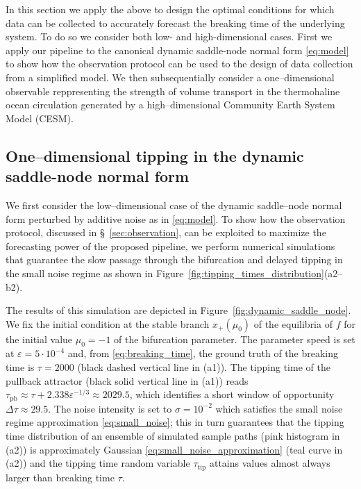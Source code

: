 \documentclass[openacc]{rsproca_new}
\begin{document}
In this section we apply the above to design the optimal conditions for which data can be collected to accurately forecast the breaking time of the underlying system.
To do so we consider both low- and high-dimensional cases.
First we apply our pipeline to the canonical dynamic saddle-node normal form \eqref{eq:model} to show how the observation protocol can be used to the design of data collection from a simplified model.
We then subsequentially consider a one--dimensional observable reppresenting the strength of volume transport in the thermohaline ocean circulation generated by a high--dimensional Community Earth System Model (CESM).

\subsection{One--dimensional tipping in the dynamic saddle-node normal form}\label{subsec:dynamic_sn_normal_form}

We first consider the low--dimensional case of the dynamic saddle--node normal form perturbed by additive noise as in \eqref{eq:model}.
To show how the observation protocol, discussed in \S~\ref{sec:observation}, can be exploited to maximize the forecasting power of the proposed pipeline, we perform numerical simulations that guarantee the slow passage through the bifurcation and delayed tipping in the small noise regime as shown in Figure~\ref{fig:tipping_times_distribution}(a2--b2).

The results of this simulation are depicted in Figure~\ref{fig:dynamic_saddle_node}.
We fix the initial condition at the stable branch $x_+(\mu_0)$ of the equilibria of $f$ for the initial value $\mu_0=-1$ of the bifurcation parameter.
The parameter speed is set at $\varepsilon=5\cdot10^{-4}$ and, from \eqref{eq:breaking_time}, the ground truth of the breaking time is $\tau=2000$ (black dashed vertical line in (a1)).
The tipping time of the pullback attractor (black solid vertical line in (a1)) reads $\tau_{\mathrm{pb}}\approx\tau + 2.338 \varepsilon^{-1/3}\approx 2029.5$, which identifies a short window of opportunity $\Delta\tau\approx29.5$.
The noise intensity is set to $\sigma=10^{-2}$ which satisfies the small noise regime approximation \eqref{eq:small_noise}; this in turn guarantees that the tipping time distribution of an ensemble of simulated sample paths (pink histogram in (a2)) is approximately Gaussian \eqref{eq:small_noise_approximation} (teal curve in (a2)) and the tipping time random variable $\tau_{\mathrm{tip}}$ attains values almost always larger than breaking time $\tau$.
\end{document}
